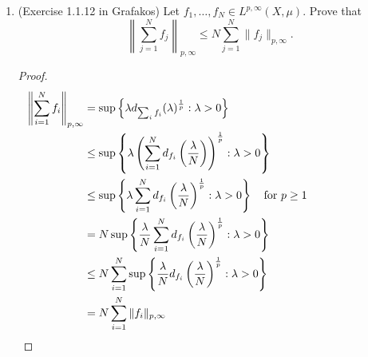 \documentclass[a4paper]{article}
\begin{document}
\begin{enumerate}
\begin{proof}
\begin{enumerate}
        \item

          Let $f$ be the characteristic function of the area between the curve $y = \frac{1}{x}$ and the $x-$ axis for $\frac{1}{n} \leq x \leq n$.
          Take a point $(x,y)$ in the first quadrant with $1 \leq x \leq n$. By looking at the rectangle connecting $(x,y)$
          to the origin, we have
          \begin{align*}
            M_s f(x,y) &\geq \frac{1}{ \left(x - \frac{1}{n} \right) y} \int_{\frac{1}{n}}^{x} \frac{1}{t} dt \\
            &= \frac{\log x + \log n}{\left( x - \frac{1}{n} \right) y} \\
            &\geq \frac{\log n}{xy}
          \end{align*}

          So we have $M_s f \geq \lambda$ if $y \leq \frac{\log n}{\lambda x}$. We will let $\lambda = 1$. Then
          \begin{align*}
            \mu \left( \{ M_s f > 1 \} \right) &\geq \int_{1}^{n} \frac{\log n}{t} dt \\
            &= \log^2 n
          \end{align*}

          We notice $\| f \|_{L^1} = 2 \log n$. Therefore, by increasing $n$ we see that we cannot have a constant such that
          \[ \log^2 n \leq \mu \left( \{ M_s f > 1 \} \right) \leq C \log n \]
          and $M_s$ is not weak type (1,1).

      \end{enumerate}

    \end{proof}

  \item (Exercise 1.1.12 in Grafakos) Let $f_1, \dots, f_N \in L^{p,\infty}(X,\mu)$. Prove that
    \[ \left\| \sum_{j=1}^N f_j \right\|_{p,\infty} \leq N \sum_{j=1}^N \| f_j \|_{p,\infty} .\]

    \begin{proof}

      \begin{align*}
        \left\| \sum_{i=1}^N f_i \right\|_{p,\infty} &= \sup \left\{ \lambda d_{\sum_i f_i}(\lambda)^{\frac{1}{p}} : \lambda>0 \right\} \\
        &\leq \sup \left\{ \lambda \left( \sum_{i=1}^N d_{f_i} \left( \frac{\lambda}{N} \right) \right)^{\frac{1}{p}} : \lambda>0 \right\} \\
        &\leq \sup \left\{ \lambda \sum_{i=1}^N d_{f_i} \left( \frac{\lambda}{N} \right)^{\frac{1}{p}} : \lambda >0 \right\} \quad \parbox{4cm}{for $p \geq 1$} \\
        &= N \sup \left\{ \frac{\lambda}{N} \sum_{i=1}^N d_{f_i} \left( \frac{\lambda}{N} \right)^\frac{1}{p} : \lambda > 0 \right\} \\
        &\leq N \sum_{i=1}^N \sup \left\{ \frac{\lambda}{N} d_{f_i} \left( \frac{\lambda}{N} \right)^\frac{1}{p} : \lambda>0 \right\} \\
        &= N \sum_{i=1}^N \|f_i\|_{p,\infty}
      \end{align*}


\end{proof}
\end{enumerate}
\end{document}
